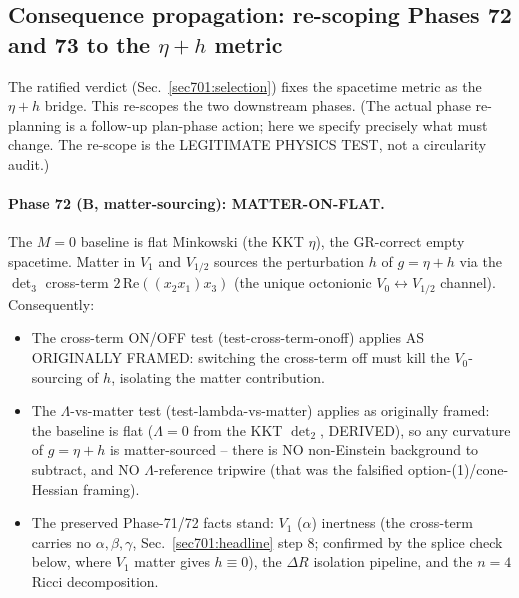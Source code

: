 \subsection{Consequence propagation: re-scoping Phases 72 and 73 to the $\eta+h$ metric}
\label{sec701:propagation}

The ratified verdict (Sec.~\ref{sec701:selection}) fixes the spacetime metric as the
$\eta+h$ bridge. This re-scopes the two downstream phases. (The actual phase re-planning is
a follow-up plan-phase action; here we specify precisely what must change. The re-scope is
the LEGITIMATE PHYSICS TEST, not a circularity audit.)

\paragraph{Phase 72 (B, matter-sourcing): MATTER-ON-FLAT.} The $M=0$ baseline is flat
Minkowski (the KKT $\eta$), the GR-correct empty spacetime. Matter in $V_1$ and $V_{1/2}$
sources the perturbation $h$ of $g=\eta+h$ via the $\det_3$ cross-term
$2\,\mathrm{Re}((x_2 x_1)x_3)$ (the unique octonionic $V_0\!\leftrightarrow\!V_{1/2}$
channel). Consequently:
\begin{itemize}
  \item The cross-term ON/OFF test (test-cross-term-onoff) applies AS ORIGINALLY FRAMED:
        switching the cross-term off must kill the $V_0$-sourcing of $h$, isolating the
        matter contribution.
  \item The $\Lambda$-vs-matter test (test-lambda-vs-matter) applies as originally framed:
        the baseline is flat ($\Lambda=0$ from the KKT $\det_2$, DERIVED), so any curvature
        of $g=\eta+h$ is matter-sourced -- there is NO non-Einstein background to subtract,
        and NO $\Lambda$-reference tripwire (that was the falsified option-(1)/cone-Hessian
        framing).
  \item The preserved Phase-71/72 facts stand: $V_1$ ($\alpha$) inertness (the cross-term
        carries no $\alpha,\beta,\gamma$, Sec.~\ref{sec701:headline} step 8; confirmed by
        the splice check below, where $V_1$ matter gives $h\equiv0$), the $\Delta R$
        isolation pipeline, and the $n=4$ Ricci decomposition.
\end{itemize}

